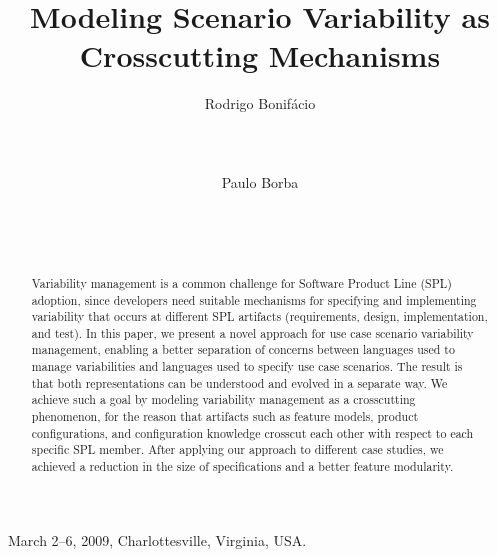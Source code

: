 \documentclass{acm_proc_article-sp}
\begin{document}
 {March 2--6, 2009, Charlottesville, Virginia, USA.} 


\lstset{language=Haskell, numbers=left,
numberstyle=\tiny,numbersep=5pt,basicstyle=\scriptsize,aboveskip=20pt}

\title{Modeling Scenario Variability as Crosscutting Mechanisms}



\author{
\alignauthor
Rodrigo Bonif\'{a}cio\\
       \\
       \\
       \\
\alignauthor
Paulo Borba\\
       \\
       \\
       \\
}

\maketitle

\begin{abstract}
Variability management is a common challenge for Software Product
Line (SPL) adoption, since developers need suitable
mechanisms for specifying and implementing variability
that occurs at different SPL artifacts (requirements, design,
implementation, and test). In this paper, we present a novel approach for
use case scenario variability management, enabling a better
separation of concerns between languages used to manage
variabilities and languages used to specify use case scenarios. The
result is that both representations can be understood and evolved in
a separate way. We achieve such a goal by modeling variability management
as a crosscutting phenomenon, for the reason that artifacts such as feature models,
product configurations, and configuration knowledge crosscut each
other with respect to each specific SPL member. After applying our approach to
different case studies, we achieved a reduction in the size of specifications
and a better feature modularity.
\end{abstract}
\end{document}

